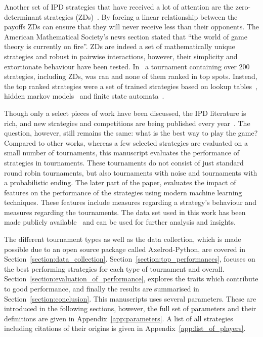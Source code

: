 \documentclass{article}
\newcommand{\numberofalltournaments}{}
\newcommand{\numberofstrategies}{}
\begin{document}
Another set of IPD strategies that have received a lot of attention
are the zero-determinant strategies (ZDs)~\cite{Press2012}. By
forcing a linear relationship between the payoffs ZDs can ensure that they will
never receive less than their opponents. The
American Mathematical Society's news section stated that ``the world of game
theory is currently on fire''.
ZDs are indeed a set of mathematically unique strategies
and robust in pairwise interactions, however, their simplicity and extortionate
behaviour have been tested. In~\cite{Harper2017} a tournament containing over
200 strategies, including ZDs, was ran and none of them
ranked in top spots. Instead, the top ranked strategies were a set of
trained strategies based on lookup tables~\cite{Axelrod1987}, hidden markov
models~\cite{Harper2017} and finite state automata~\cite{Miller1996}.

Though only a select pieces of work have been discussed, the IPD literature is
rich, and new strategies and competitions are being published every year~\cite{Glynatsi2019}. The
question, however, still remains the same: what is the best way to play the
game? Compared to other works, whereas a few selected strategies are evaluated
on a small number of tournaments, this manuscript evaluates the performance of \numberofstrategies
strategies in \numberofalltournaments tournaments. These tournaments do not
consist of just standard round robin tournaments, but also tournaments with noise
and tournaments with a probabilistic ending. The later part of the paper, evaluates
the impact of features on the performance of the strategies using modern
machine learning techniques. These features include measures regarding a
strategy's behaviour and measures regarding the tournaments. The data set used
in this work has been made publicly available~\cite{data} and can be used
for further analysis and insights.

The different tournament types as well as the data collection, which is made
possible due to an open source package called Axelrod-Python,
are covered in Section~\ref{section:data_collection}.
Section~\ref{section:top_performances}, focuses on the best performing
strategies for each type of tournament and overall.
Section~\ref{section:evaluation_of_performance}, explores the traits which
contribute to good performance, and finally the results are summarised in
Section~\ref{section:conclusion}. This manuscripts uses several parameters.
These are introduced in the following sections, however, the full set of
parameters and their definitions are given in Appendix~\ref{app:parameters}.
A list of all strategies including citations of their origins is given in
Appendix~\ref{app:list_of_players}.
\end{document}
